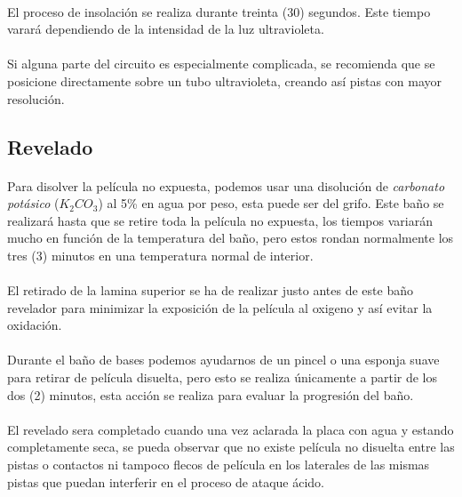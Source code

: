 \paragraph{} El proceso de insolación se realiza durante treinta (30) segundos. Este tiempo varará dependiendo de la intensidad de la luz ultravioleta.

\paragraph{} Si alguna parte del circuito es especialmente complicada, se recomienda que se posicione directamente sobre un tubo ultravioleta, creando así pistas con mayor resolución.

\subsection{Revelado}

\paragraph{} Para disolver la película no expuesta, podemos usar una disolución de \textit{carbonato potásico} ($K_2CO_3$) al 5\% en agua por peso, esta puede ser del grifo. Este baño se realizará hasta que se retire toda la película no expuesta, los tiempos variarán mucho en función de la temperatura del baño, pero estos rondan normalmente los tres (3) minutos en una temperatura normal de interior.

\paragraph{} El retirado de la lamina superior se ha de realizar justo antes de este baño revelador para minimizar la exposición de la película al oxigeno y así evitar la oxidación.

\paragraph{} Durante el baño de bases podemos ayudarnos de un pincel o una esponja suave para retirar de película disuelta, pero esto se realiza únicamente a partir de los dos (2) minutos, esta acción se realiza para evaluar la progresión del baño.

\paragraph{} El revelado sera completado cuando una vez aclarada la placa con agua y estando completamente seca, se pueda observar que no existe película no disuelta entre las pistas o contactos ni tampoco flecos de película en los laterales de las mismas pistas que puedan interferir en el proceso de ataque ácido.

